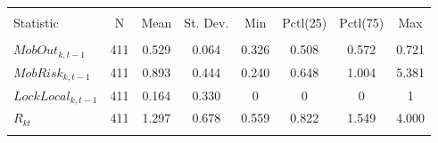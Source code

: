 \begin{tabular}{@{\extracolsep{5pt}}lccccccc} 
\\[-1.8ex]\hline 
\hline \\[-1.8ex] 
Statistic & \multicolumn{1}{c}{N} & \multicolumn{1}{c}{Mean} & \multicolumn{1}{c}{St. Dev.} & \multicolumn{1}{c}{Min} & \multicolumn{1}{c}{Pctl(25)} & \multicolumn{1}{c}{Pctl(75)} & \multicolumn{1}{c}{Max} \\ 
\hline \\[-1.8ex] 
$MobOut_{k,t-1}$ & 411 & 0.529 & 0.064 & 0.326 & 0.508 & 0.572 & 0.721 \\ 
$MobRisk_{k,t-1}$ & 411 & 0.893 & 0.444 & 0.240 & 0.648 & 1.004 & 5.381 \\ 
$LockLocal_{k,t-1}$ & 411 & 0.164 & 0.330 & 0 & 0 & 0 & 1 \\ 
$R_{kt}$ & 411 & 1.297 & 0.678 & 0.559 & 0.822 & 1.549 & 4.000 \\ 
\hline \\[-1.8ex] 
\end{tabular} 





